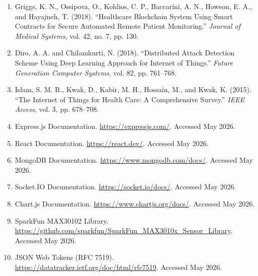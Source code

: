 \begin{enumerate}[leftmargin=*]
\item Griggs, K. N., Ossipova, O., Kohlios, C. P., Baccarini, A. N., Howson, E. A., and Hayajneh, T. (2018). ``Healthcare Blockchain System Using Smart Contracts for Secure Automated Remote Patient Monitoring.'' \textit{Journal of Medical Systems}, vol. 42, no. 7, pp. 130.

\item Diro, A. A. and Chilamkurti, N. (2018). ``Distributed Attack Detection Scheme Using Deep Learning Approach for Internet of Things.'' \textit{Future Generation Computer Systems}, vol. 82, pp. 761--768.

\item Islam, S. M. R., Kwak, D., Kabir, M. H., Hossain, M., and Kwak, K. (2015). ``The Internet of Things for Health Care: A Comprehensive Survey.'' \textit{IEEE Access}, vol. 3, pp. 678--708.

\item Express.js Documentation. \url{https://expressjs.com/}. Accessed May 2026.

\item React Documentation. \url{https://react.dev/}. Accessed May 2026.

\item MongoDB Documentation. \url{https://www.mongodb.com/docs/}. Accessed May 2026.

\item Socket.IO Documentation. \url{https://socket.io/docs/}. Accessed May 2026.

\item Chart.js Documentation. \url{https://www.chartjs.org/docs/}. Accessed May 2026.

\item SparkFun MAX30102 Library. \url{https://github.com/sparkfun/SparkFun_MAX3010x_Sensor_Library}. Accessed May 2026.

\item JSON Web Tokens (RFC 7519). \url{https://datatracker.ietf.org/doc/html/rfc7519}. Accessed May 2026.

\end{enumerate}

